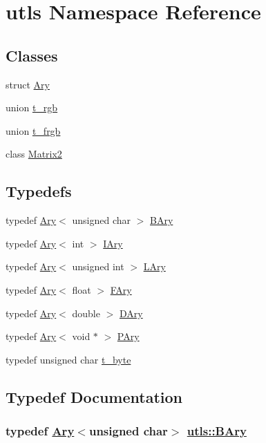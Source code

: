 \hypertarget{namespaceutls}{
\section{utls Namespace Reference}
\label{namespaceutls}
}


\subsection*{Classes}
\begin{CompactItemize}
\item 
struct \hyperlink{structutls_1_1Ary}{Ary}
\item 
union \hyperlink{unionutls_1_1t__rgb}{t\_\-rgb}
\item 
union \hyperlink{unionutls_1_1t__frgb}{t\_\-frgb}
\item 
class \hyperlink{classutls_1_1Matrix2}{Matrix2}
\end{CompactItemize}
\subsection*{Typedefs}
\begin{CompactItemize}
\item 
typedef \hyperlink{structutls_1_1Ary}{Ary}$<$ unsigned char $>$ \hyperlink{namespaceutls_7b315fe6e5893d522a713ce2e66d6ae2}{BAry}
\item 
typedef \hyperlink{structutls_1_1Ary}{Ary}$<$ int $>$ \hyperlink{namespaceutls_cedb1dc4cf8e712ee80ed835d1657adf}{IAry}
\item 
typedef \hyperlink{structutls_1_1Ary}{Ary}$<$ unsigned int $>$ \hyperlink{namespaceutls_ba708fd37f65874aeb7d0f58064f38f7}{LAry}
\item 
typedef \hyperlink{structutls_1_1Ary}{Ary}$<$ float $>$ \hyperlink{namespaceutls_9861f46a061f0d50e5206260ce344e3b}{FAry}
\item 
typedef \hyperlink{structutls_1_1Ary}{Ary}$<$ double $>$ \hyperlink{namespaceutls_7fda688c7bc81c289b7285486f269999}{DAry}
\item 
typedef \hyperlink{structutls_1_1Ary}{Ary}$<$ void $\ast$ $>$ \hyperlink{namespaceutls_4e1d37c1ae35859d94f2abc53c6e32f4}{PAry}
\item 
typedef unsigned char \hyperlink{namespaceutls_dc090f96c41011207bfa8d70a498322f}{t\_\-byte}
\end{CompactItemize}


\subsection{Typedef Documentation}
\hypertarget{namespaceutls_7b315fe6e5893d522a713ce2e66d6ae2}{
\subsubsection[BAry]{\setlength{\rightskip}{0pt plus 5cm}typedef \hyperlink{structutls_1_1Ary}{Ary}$<$unsigned char$>$ \hyperlink{structutls_1_1Ary}{utls::BAry}}}
\label{namespaceutls_7b315fe6e5893d522a713ce2e66d6ae2}


